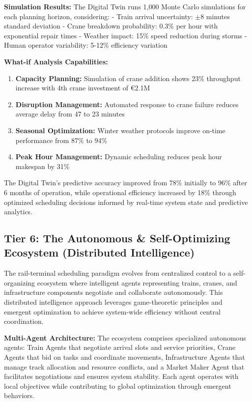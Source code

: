 \documentclass{article}
\begin{document}
\textbf{Simulation Results:}
The Digital Twin runs 1,000 Monte Carlo simulations for each planning horizon, considering:
- Train arrival uncertainty: $\pm$8 minutes standard deviation
- Crane breakdown probability: 0.3\% per hour with exponential repair times
- Weather impact: 15\% speed reduction during storms
- Human operator variability: 5-12\% efficiency variation

\textbf{What-if Analysis Capabilities:}
\begin{enumerate}
\item \textbf{Capacity Planning:} Simulation of crane addition shows 23\% throughput increase with 4th crane investment of €2.1M
\item \textbf{Disruption Management:} Automated response to crane failure reduces average delay from 47 to 23 minutes
\item \textbf{Seasonal Optimization:} Winter weather protocols improve on-time performance from 87\% to 94\%
\item \textbf{Peak Hour Management:} Dynamic scheduling reduces peak hour makespan by 31\%
\end{enumerate}

The Digital Twin's predictive accuracy improved from 78\% initially to 96\% after 6 months of operation, while operational efficiency increased by 18\% through optimized scheduling decisions informed by real-time system state and predictive analytics.

\subsection{Tier 6: The Autonomous \& Self-Optimizing Ecosystem (Distributed Intelligence)}

The rail-terminal scheduling paradigm evolves from centralized control to a self-organizing ecosystem where intelligent agents representing trains, cranes, and infrastructure components negotiate and collaborate autonomously. This distributed intelligence approach leverages game-theoretic principles and emergent optimization to achieve system-wide efficiency without central coordination.

\textbf{Multi-Agent Architecture:}
The ecosystem comprises specialized autonomous agents: Train Agents that negotiate arrival slots and service priorities, Crane Agents that bid on tasks and coordinate movements, Infrastructure Agents that manage track allocation and resource conflicts, and a Market Maker Agent that facilitates negotiations and ensures system stability. Each agent operates with local objectives while contributing to global optimization through emergent behaviors.
\end{document}
